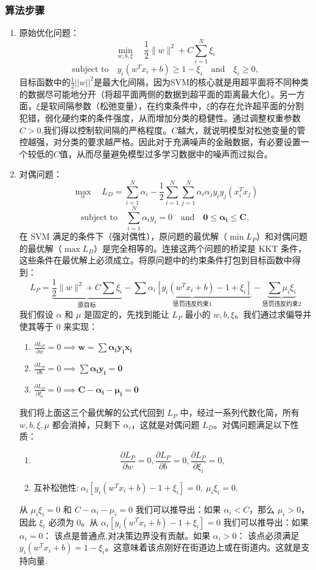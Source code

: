 \documentclass[11pt, a4paper]{article}
\begin{document}
\subsubsection{算法步骤}
\begin{enumerate}
    \item 原始优化问题：$$\min_{w,b,\xi} \quad \frac{1}{2}\|w\|^2 + C \sum_{i=1}^N \xi_i$$ $$
    \text{subject to} \quad y_i(w^T x_i + b) \ge 1 - \xi_i \quad \text{and} \quad \xi_i \ge 0,$$目标函数中的$\frac{1}{2}||w||^2$是最大化间隔，因为SVM的核心就是用超平面将不同种类的数据尽可能地分开（将超平面两侧的数据到超平面的距离最大化）。另一方面，$\xi$是软间隔参数（松弛变量），在约束条件中，$\xi$的存在允许超平面的分割犯错，弱化硬约束的条件强度，从而增加分类的稳健性。通过调整权重参数$C>0$,我们得以控制软间隔的严格程度。$C$越大，就说明模型对松弛变量的管控越强，对分类的要求越严格。因此对于充满噪声的金融数据，有必要设置一个较低的$C$值，从而尽量避免模型过多学习数据中的噪声而过拟合。
    \item 对偶问题：$$\max_{\alpha} \quad L_D = \sum_{i=1}^N \alpha_i - \frac{1}{2}\sum_{i=1}^N \sum_{j=1}^N \alpha_i \alpha_j y_i y_j (x_i^T x_j)$$ $$
    \text{subject to} \quad \sum_{i=1}^N \alpha_i y_i = 0 \quad \text{and} \quad \mathbf{0 \le \alpha_i \le C},$$在 SVM 满足的条件下（强对偶性），原问题的最优解（$\min L_P$）和对偶问题的最优解（$\max L_D$）是完全相等的。连接这两个问题的桥梁是 KKT 条件，这些条件在最优解上必须成立。将原问题中的约束条件打包到目标函数中得到：$$L_P = \underbrace{\frac{1}{2}\|w\|^2 + C \sum \xi_i}_{\text{原目标}} - \underbrace{\sum \alpha_i [y_i(w^T x_i + b) - 1 + \xi_i]}_{\text{惩罚违反约束1}} - \underbrace{\sum \mu_i \xi_i}_{\text{惩罚违反约束2}}$$我们假设 $\alpha$ 和 $\mu$ 是固定的，先找到能让 $L_P$ 最小的 $w, b, \xi$。我们通过求偏导并使其等于 0 来实现：\begin{enumerate}
        \item $\frac{\partial L_P}{\partial w} = 0 \implies \mathbf{w = \sum \alpha_i y_i x_i}$
        \item $\frac{\partial L_P}{\partial b} = 0 \implies \mathbf{\sum \alpha_i y_i = 0}$
        \item $\frac{\partial L_P}{\partial \xi_i} = 0 \implies \mathbf{C - \alpha_i - \mu_i = 0}$
    \end{enumerate}
    我们将上面这三个最优解的公式代回到 $L_P$ 中，经过一系列代数化简，所有 $w, b, \xi, \mu$ 都会消掉，只剩下 $\alpha_i$，这就是对偶问题 $L_D$。对偶问题满足以下性质：
    \begin{enumerate}
        \item $$\frac{\partial L_P}{\partial w}=0, \frac{\partial L_P}{\partial b}=0, \frac{\partial L_P}{\partial \xi_i}=0,$$ 
        \item 互补松弛性:$\ \alpha_i [y_i(w^T x_i + b) - 1 + \xi_i] = 0,\ \mu_i \xi_i = 0.$
    \end{enumerate}
    从 $\mu_i \xi_i = 0$ 和 $C - \alpha_i - \mu_i = 0$ 我们可以推导出：如果 $\alpha_i < C$，那么 $\mu_i > 0$，因此 $\xi_i$ 必须为 0。从 $\alpha_i [y_i(w^T x_i + b) - 1 + \xi_i] = 0$ 我们可以推导出：如果 $\alpha_i = 0$： 该点是普通点,对决策边界没有贡献。如果 $\alpha_i > 0$： 该点必须满足 $y_i(w^T x_i + b) = 1 - \xi_i$。这意味着该点刚好在街道边上或在街道内。这就是支持向量.


\end{enumerate}
\end{document}
